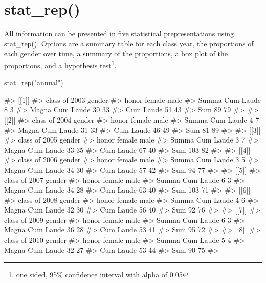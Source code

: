 \section{stat\_rep()}\label{stat_rep}

All information can be presented in five statistical prepresentations
using stat\_rep(). Options are a summary table for each class year, the
proportions of each gender over time, a summary of the proportions, a
box plot of the proportions, and a hypothesis test\footnote{one sided,
  95\% confidence interval with alpha of 0.05}.

\begin{Schunk}
\begin{Sinput}
stat_rep("annual")
\end{Sinput}
\begin{Soutput}
#> [[1]]
#>                  class of 2003 gender
#> honor             female male
#>   Summa Cum Laude      8    3
#>   Magna Cum Laude     30   33
#>   Cum Laude           51   43
#>   Sum                 89   79
#> 
#> [[2]]
#>                  class of 2004 gender
#> honor             female male
#>   Summa Cum Laude      4    7
#>   Magna Cum Laude     31   33
#>   Cum Laude           46   49
#>   Sum                 81   89
#> 
#> [[3]]
#>                  class of 2005 gender
#> honor             female male
#>   Summa Cum Laude      3    7
#>   Magna Cum Laude     33   35
#>   Cum Laude           67   40
#>   Sum                103   82
#> 
#> [[4]]
#>                  class of 2006 gender
#> honor             female male
#>   Summa Cum Laude      3    5
#>   Magna Cum Laude     34   30
#>   Cum Laude           57   42
#>   Sum                 94   77
#> 
#> [[5]]
#>                  class of 2007 gender
#> honor             female male
#>   Summa Cum Laude      6    3
#>   Magna Cum Laude     34   28
#>   Cum Laude           63   40
#>   Sum                103   71
#> 
#> [[6]]
#>                  class of 2008 gender
#> honor             female male
#>   Summa Cum Laude      4    6
#>   Magna Cum Laude     32   30
#>   Cum Laude           56   40
#>   Sum                 92   76
#> 
#> [[7]]
#>                  class of 2009 gender
#> honor             female male
#>   Summa Cum Laude      6    3
#>   Magna Cum Laude     36   28
#>   Cum Laude           53   41
#>   Sum                 95   72
#> 
#> [[8]]
#>                  class of 2010 gender
#> honor             female male
#>   Summa Cum Laude      5    4
#>   Magna Cum Laude     32   27
#>   Cum Laude           53   44
#>   Sum                 90   75
#> 

\end{Soutput}
\end{Schunk}
